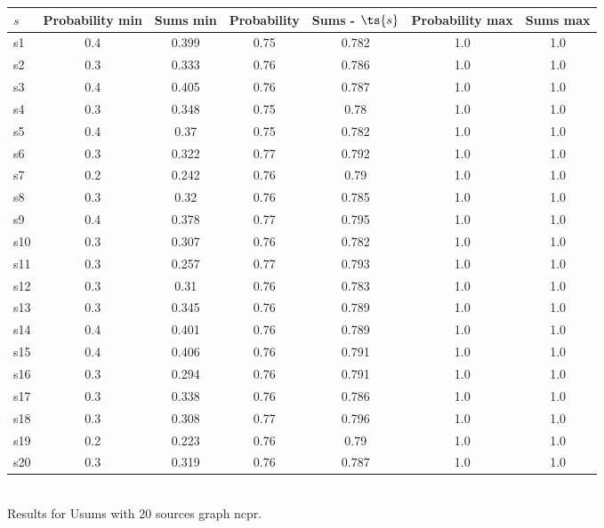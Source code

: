 \documentclass{article}
\begin{document}
\noindent\begin{tabular}{|l|c|c|c|c|c|c|}
\hline
$s$& Probability min & Sums min & Probability & Sums - $\ts{s}$ & Probability max & Sums max\\
\hline
s1 &0.4 & 0.399 & 0.75 & 0.782 & 1.0 & 1.0\\
\hline
s2 &0.3 & 0.333 & 0.76 & 0.786 & 1.0 & 1.0\\
\hline
s3 &0.4 & 0.405 & 0.76 & 0.787 & 1.0 & 1.0\\
\hline
s4 &0.3 & 0.348 & 0.75 & 0.78 & 1.0 & 1.0\\
\hline
s5 &0.4 & 0.37 & 0.75 & 0.782 & 1.0 & 1.0\\
\hline
s6 &0.3 & 0.322 & 0.77 & 0.792 & 1.0 & 1.0\\
\hline
s7 &0.2 & 0.242 & 0.76 & 0.79 & 1.0 & 1.0\\
\hline
s8 &0.3 & 0.32 & 0.76 & 0.785 & 1.0 & 1.0\\
\hline
s9 &0.4 & 0.378 & 0.77 & 0.795 & 1.0 & 1.0\\
\hline
s10 &0.3 & 0.307 & 0.76 & 0.782 & 1.0 & 1.0\\
\hline
s11 &0.3 & 0.257 & 0.77 & 0.793 & 1.0 & 1.0\\
\hline
s12 &0.3 & 0.31 & 0.76 & 0.783 & 1.0 & 1.0\\
\hline
s13 &0.3 & 0.345 & 0.76 & 0.789 & 1.0 & 1.0\\
\hline
s14 &0.4 & 0.401 & 0.76 & 0.789 & 1.0 & 1.0\\
\hline
s15 &0.4 & 0.406 & 0.76 & 0.791 & 1.0 & 1.0\\
\hline
s16 &0.3 & 0.294 & 0.76 & 0.791 & 1.0 & 1.0\\
\hline
s17 &0.3 & 0.338 & 0.76 & 0.786 & 1.0 & 1.0\\
\hline
s18 &0.3 & 0.308 & 0.77 & 0.796 & 1.0 & 1.0\\
\hline
s19 &0.2 & 0.223 & 0.76 & 0.79 & 1.0 & 1.0\\
\hline
s20 &0.3 & 0.319 & 0.76 & 0.787 & 1.0 & 1.0\\
\hline
\end{tabular}\\

\noindent Results for Usums with 20 sources graph ncpr.
\end{document}
